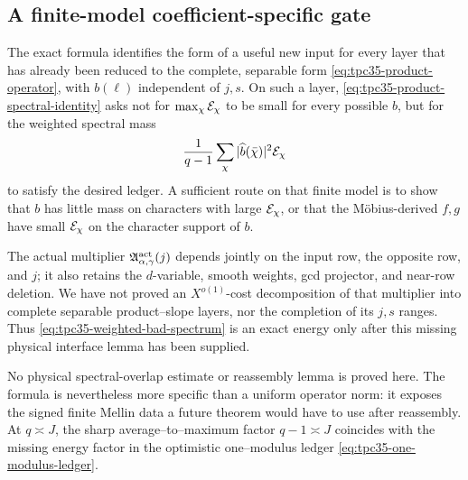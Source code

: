 \subsection{A finite-model coefficient-specific gate}

The exact formula identifies the form of a useful new input for every
layer that has already been reduced to the complete, separable form
\eqref{eq:tpc35-product-operator}, with \(b(\ell)\) independent of
\(j,s\).  On such a layer,
\eqref{eq:tpc35-product-spectral-identity} asks not for
\(\max_\chi\mathcal E_\chi\) to be small for every possible \(b\), but for the
weighted spectral mass
\begin{equation}
 \frac1{q-1}\sum_\chi
 |\widehat b(\bar\chi)|^2\mathcal E_\chi
 \label{eq:tpc35-weighted-bad-spectrum}
\end{equation}
to satisfy the desired ledger.  A sufficient route on that finite model
is to show that \(b\) has little mass on characters with large
\(\mathcal E_\chi\), or that the M\"obius-derived \(f,g\) have small
\(\mathcal E_\chi\) on the character support of \(b\).

The actual multiplier
\(\mathfrak A_{\alpha,\gamma}^{\rm act}(j)\) depends jointly on the input
row, the opposite row, and \(j\); it also retains the \(d\)-variable,
smooth weights, gcd projector, and near-row deletion.  We have not proved
an \(X^{o(1)}\)-cost decomposition of that multiplier into complete
separable product--slope layers, nor the completion of its \(j,s\) ranges.
Thus \eqref{eq:tpc35-weighted-bad-spectrum} is an exact energy only after
this missing physical interface lemma has been supplied.

No physical spectral-overlap estimate or reassembly lemma is proved here.
The formula is nevertheless more specific than a uniform operator norm:
it exposes the signed finite Mellin data a future theorem would have to
use after reassembly.  At \(q\asymp J\), the sharp
average--to--maximum factor \(q-1\asymp J\) coincides with the missing
energy factor in the optimistic one--modulus ledger
\eqref{eq:tpc35-one-modulus-ledger}.
